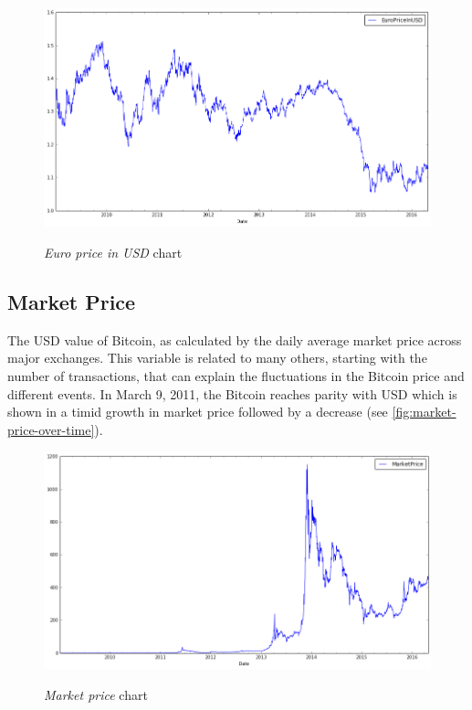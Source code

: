\begin{figure}[bth]
  \myfloatalign
  {\includegraphics[width=1\linewidth]
    {gfx/euro-price-in-usd-over-time}} 
  \caption{\textit{Euro price in USD} chart}
  \label{fig:euro-price-in-usd-over-time}
\end{figure}


\subsection{Market Price}
\label{sec:market-price}



The USD value of Bitcoin, as calculated by the daily average market
price across major exchanges. This variable is related to many others,
starting with the number of transactions, that can explain the
fluctuations in the Bitcoin price and different events. In March 9,
2011, the Bitcoin reaches parity with USD which is shown in a timid
growth in market price followed by a decrease (see
\autoref{fig:market-price-over-time}).

\begin{figure}[bth]
  \myfloatalign
  {\includegraphics[width=1\linewidth]
    {gfx/market-price-over-time}}
  \caption{\textit{Market price} chart}
  \label{fig:market-price-over-time}
\end{figure}

